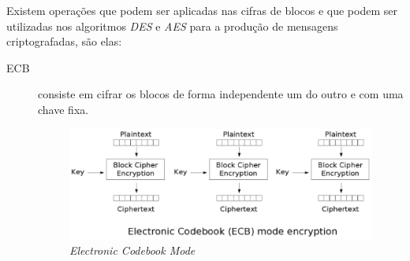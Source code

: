 Existem operações que podem ser aplicadas nas cifras de blocos e que podem ser utilizadas nos algoritmos \textit{DES} e \textit{AES} para a produção de mensagens criptografadas, são elas:

\begin{description}
\item [ECB]consiste em cifrar os blocos de forma independente um do outro e com uma chave fixa.
\begin{figure}[h]
\centering
\includegraphics[keepaspectratio=true,scale=0.7]
	{figuras/ecb.eps}
	\caption[Electronic Codebook Mode]{\textit{Electronic Codebook Mode}\protect\footnotemark}
	

\end{figure}
\end{description}
